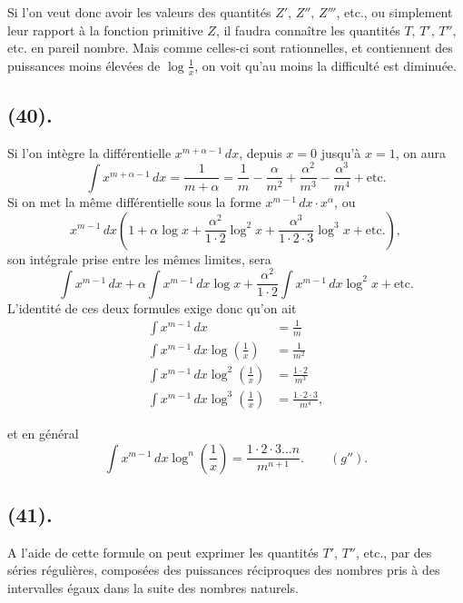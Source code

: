 \documentclass{article}
\begin{document}
Si l'on veut donc avoir les valeurs des quantités $Z'$, $Z''$, $Z'''$, etc., ou simplement leur rapport à la fonction primitive $Z$, il faudra connaître les quantités $T$, $T'$, $T''$, etc. en pareil nombre. Mais comme celles-ci sont rationnelles, et contiennent des puissances moins élevées de $\log\frac{1}{x}$, on voit qu'au moins la difficulté est diminuée.

\subsection*{(40).}

Si l'on intègre la différentielle $x^{m+\alpha-1}\,dx$, depuis $x=0$ jusqu'à $x=1$, on aura
\[ \int x^{m+\alpha-1}\,dx=\frac{1}{m+\alpha}=\frac{1}{m}-\frac{\alpha}{m^{2}}+\frac{\alpha^{2}}{m^{3}}-\frac{\alpha^{3}}{m^{4}}+\text{etc.} \]
Si on met la même différentielle sous la forme $x^{m-1}\,dx\cdot x^{\alpha}$, ou
\[ x^{m-1}\,dx\left(1+\alpha\log x+\frac{\alpha^{2}}{1\cdot 2}\log^{2}x+\frac{\alpha^{3}}{1\cdot 2\cdot 3}\log^{3}x+\text{etc.}\right), \]
son intégrale prise entre les mêmes limites, sera
\[ \int x^{m-1}\,dx+\alpha\int x^{m-1}\,dx\log x+\frac{\alpha^{2}}{1\cdot 2}\int x^{m-1}\,dx\log^{2}x+\text{etc.} \]
L'identité de ces deux formules exige donc qu'on ait
\[ \begin{aligned} \int x^{m-1}\,dx&=\frac{1}{m}\\ \int x^{m-1}\,dx\log\left(\frac{1}{x}\right)&=\frac{1}{m^{2}}\\ \int x^{m-1}\,dx\log^{2}\left(\frac{1}{x}\right)&=\frac{1\cdot 2}{m^{3}}\\ \int x^{m-1}\,dx\log^{3}\left(\frac{1}{x}\right)&=\frac{1\cdot 2\cdot 3}{m^{4}}, \end{aligned} \]

et en général
\[ \int x^{m-1}\,dx\log^{n}\left(\frac{1}{x}\right)=\frac{1\cdot 2\cdot 3\ldots n}{m^{n+1}}.\qquad(g''). \]

\subsection*{(41).}

A l'aide de cette formule on peut exprimer les quantités $T'$, $T''$, etc., par des séries régulières, composées des puissances réciproques des nombres pris à des intervalles égaux dans la suite des nombres naturels.
\end{document}

